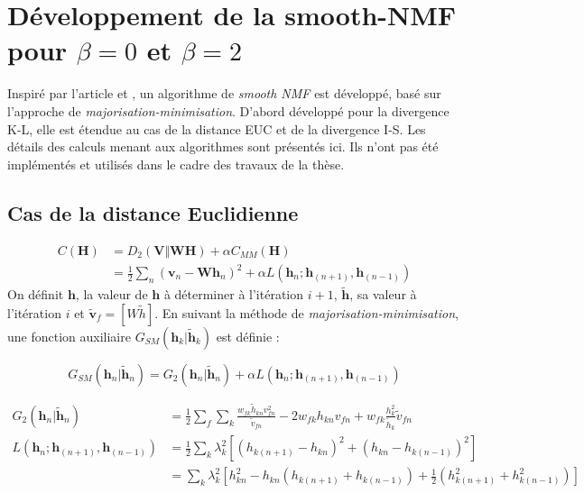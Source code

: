 \chapter{Développement de la smooth-NMF pour $\beta = 0$ et $\beta = 2$}\label{annex:smoothNMF}

Inspiré par l'article \cite{essid2013smooth} et \cite{fevotte_algorithms_2011}, un algorithme de \textit{smooth NMF} est développé, basé sur l'approche de \textit{majorisation-minimisation}. D'abord développé pour la divergence K-L, elle est étendue au cas de la distance EUC et de la divergence I-S. Les détails des calculs menant aux algorithmes sont présentés ici. Ils n'ont pas été implémentés et utilisés dans le cadre des travaux de la thèse.

\section{Cas de la distance Euclidienne}
\begin{align}
C(\mathbf{H}) &= D_2(\mathbf{V} \Vert \mathbf{WH}) + \alpha C_{MM}(\mathbf{H})\\
 &= \frac{1}{2}\sum_n(\mathbf{v}_n-\mathbf{Wh}_n)^2+\alpha L(\mathbf{h}_{n}; \mathbf{h}_{(n+1)}, \mathbf{h}_{(n-1)}) 
\end{align}
On définit $\mathbf{h}$, la valeur de $\mathbf{h}$ à déterminer à l'itération $i+1$, $\mathbf{\tilde{h}}$, sa valeur à l'itération $i$ et $\mathbf{\tilde{v}}_f = \left[W\tilde{h}\right]$.
En suivant la méthode de \textit{majorisation-minimisation}, une fonction auxiliaire $G_{SM}(\mathbf{h}_{k}\vert \mathbf{\tilde{h}}_{k})$ est définie : 

\begin{equation}
G_{SM}(\mathbf{h}_{n}\vert \mathbf{\tilde{h}}_{n}) = G_{2}(\mathbf{h}_{n}\vert \mathbf{\tilde{h}}_{n})+\alpha L(\mathbf{h}_{n}; \mathbf{h}_{(n+1)}, \mathbf{h}_{(n-1)})
\end{equation}


\begin{align}
G_{2}(\mathbf{h}_{n}\vert \mathbf{\tilde{h}}_{n}) &= \frac{1}{2}\sum_{f} \sum_k \frac{w_{fk} \tilde{h}_{kn} v_{fn}^2}{\tilde{v}_{fn}}-2 w_{fk} h_{kn} v_{fn}+w_{fk}\frac{h_{k}^2}{\tilde{h}_{k}}\tilde{v}_{fn}
\\
L(\mathbf{h}_{n}; \mathbf{h}_{(n+1)}, \mathbf{h}_{(n-1)}) &= \frac{1}{2}\sum_{k}\lambda_k^2 \left[ \left(h_{k(n+1)}-h_{kn}\right)^2+\left(h_{kn}-h_{k(n-1)}\right)^2 \right]\\
&= \sum_k \lambda_k^2 \left[ h_{kn}^2- h_{kn}\left(h_{k(n+1)}+h_{k(n-1)}\right)+\frac{1}{2} \left(h_{k(n+1)}^2+h_{k(n-1)}^2\right) \right]
\end{align}
 
